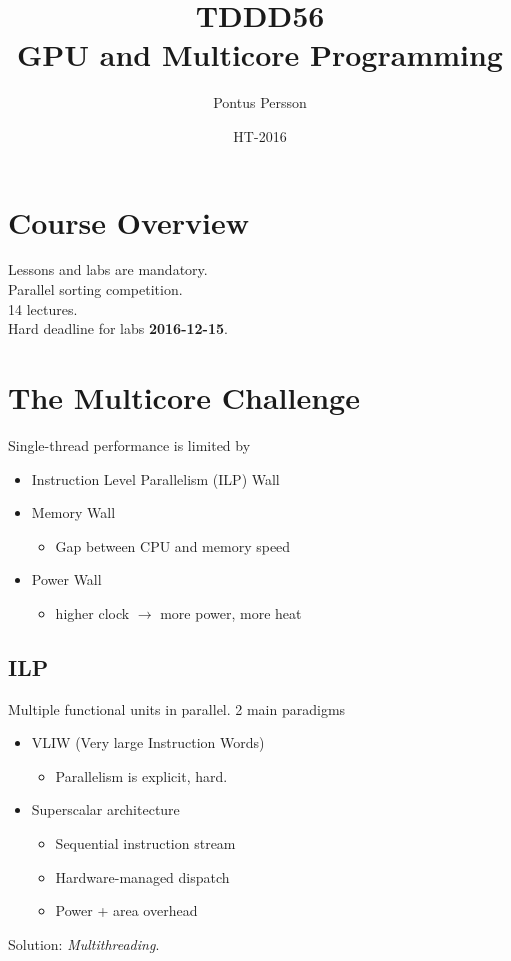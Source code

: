 \documentclass[a4paper]{article}
\title{TDDD56\\GPU and Multicore Programming}
\author{Pontus Persson}
\date{HT-2016}
\begin{document}
\maketitle
\tableofcontents

\section{Course Overview}
Lessons and labs are mandatory.\\
Parallel sorting competition.\\
14 lectures.\\
Hard deadline for labs \textbf{2016-12-15}.

\section{The Multicore Challenge }
Single-thread performance is limited by
\begin{itemize}
  \item Instruction Level Parallelism (ILP) Wall
  \item Memory Wall
    \begin{itemize}
      \item Gap between CPU and memory speed
    \end{itemize}
  \item Power Wall
    \begin{itemize}
      \item higher clock $\rightarrow$ more power, more heat
    \end{itemize}
\end{itemize}
\subsection{ILP}
Multiple functional units in parallel. 2 main paradigms
\begin{itemize}
  \item VLIW (Very large Instruction Words)
    \begin{itemize}
      \item Parallelism is explicit, hard.
    \end{itemize}
  \item Superscalar architecture
    \begin{itemize}
      \item Sequential instruction stream
      \item Hardware-managed dispatch
      \item Power + area overhead
    \end{itemize}
\end{itemize}
Solution: \textit{Multithreading}.
\end{document}

